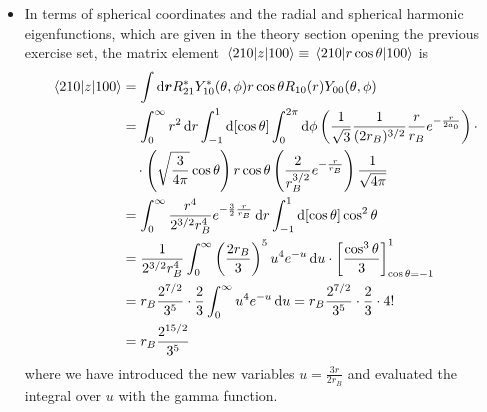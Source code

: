 \documentclass[11pt, a4paper]{article}
\newcommand{\diff}{\mathop{}\!\mathrm{d}} %
\renewcommand{\vec}[1]{\bm{#1}} %
\renewcommand{\r}{\vec{r}}  %
\begin{document}
\begin{itemize}
	\item In terms of spherical coordinates and the radial and spherical harmonic eigenfunctions, which are given in the theory section opening the previous exercise set, the matrix element $ \mel{210}{z}{100} \equiv \mel{210}{r\cos \theta}{100} $ is
	\begin{align*}
		\mel{210}{z}{100} &= \int \diff \r R_{21}^{*}Y_{10}^{*}(\theta, \phi) r \cos \theta R_{10}(r)Y_{00}(\theta, \phi)\\
		& = \int_{0}^{\infty}r^{2}\diff r \int_{-1}^{1}\diff [\cos \theta] \int_{0}^{2\pi} \diff \phi \left(\frac{1}{\sqrt{3}}\frac{1}{(2r_{B})^{3/2}}\frac{r}{r_{B}}e^{-\frac{r}{2a_{0}}}\right)\cdot\\
		&{} \quad \cdot \left(\sqrt{\frac{3}{4\pi}}\cos \theta\right) r\cos \theta \left(\frac{2}{r_{B}^{3/2}}e^{-\frac{r}{r_{B}}}\right)\frac{1}{\sqrt{4\pi}}\\
		& = \int_{0}^{\infty}\frac{r^{4}}{2^{3/2}r_{B}^{4}}e^{-\frac{3}{2}\frac{r}{r_{B}}}\diff r\int_{-1}^{1}\diff [\cos \theta] \cos^{2}\theta\\
		& = \frac{1}{2^{3/2}r_{B}^{4}} \int_{0}^{\infty} \left(\frac{2r_{B}}{3}\right)^{5} u^{4}e^{-u}\diff u \cdot \left[\frac{\cos^{3}\theta}{3}\right]_{\cos \theta = -1}^{1}\\
		& = r_{B}\frac{2^{7/2}}{3^{5}}\cdot \frac{2}{3} \int_{0}^{\infty}u^{4}e^{-u}\diff u = r_{B}\frac{2^{7/2}}{3^{5}} \cdot \frac{2}{3} \cdot 4!\\
		& = r_{B}\frac{2^{15/2}}{3^{5}}
	\end{align*}
	where we have introduced the new variables $ u = \frac{3r}{2r_{B}} $ and evaluated the integral over $ u $ with the gamma function.


\end{itemize}
\end{document}
